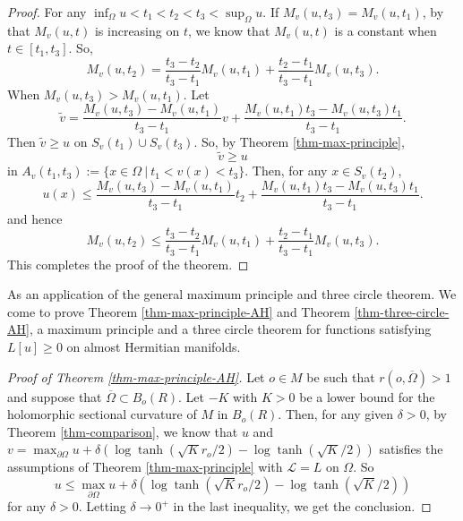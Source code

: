 \documentclass[12pt]{amsart}
\def\ol{\overline}
\def\p{\partial}
\def\ol{\overline}
\theoremstyle{definition}
\theoremstyle{remark}
\numberwithin{equation}{section}
\begin{document}
\begin{proof}
For any $\inf_\Omega u<t_1<t_2<t_3<\sup_\Omega u$.
If $M_v(u,t_3)=M_v(u,t_1)$, by that $M_v(u,t)$ is increasing on $t$, we know that $M_v(u,t)$ is a constant when $t\in [t_1,t_3]$. So,
\begin{equation}
M_v(u,t_2)=\frac{t_3-t_2}{t_3-t_1}M_v(u,t_1)+\frac{t_2-t_1}{t_3-t_1}M_v(u,t_3).
\end{equation}
When $M_v(u,t_3)>M_v(u,t_1)$. Let
\begin{equation}
\tilde v=\frac{M_v(u,t_3)-M_v(u,t_1)}{t_3-t_1}v+\frac{M_v(u,t_1)t_3-M_v(u,t_3)t_1}{t_3-t_1}.
\end{equation}
Then  $\tilde v\geq u$ on $S_v(t_1)\cup S_v(t_3)$. So, by Theorem \ref{thm-max-principle},
\begin{equation}
\tilde v\geq u
\end{equation}
in $A_v(t_1,t_3):=\{x\in\Omega\ |\ t_1<v(x)<t_3\}$. Then, for any $x\in S_v(t_2)$,
\begin{equation}
u(x)\leq \frac{M_v(u,t_3)-M_v(u,t_1)}{t_3-t_1}t_2+\frac{M_v(u,t_1)t_3-M_v(u,t_3)t_1}{t_3-t_1}.
\end{equation}
and hence
\begin{equation}
M_v(u,t_2)\leq \frac{t_3-t_2}{t_3-t_1}M_v(u,t_1)+\frac{t_2-t_1}{t_3-t_1}M_v(u,t_3).
\end{equation}
This completes the proof of the theorem.
\end{proof}
As an application of the general maximum principle  and three circle theorem. We come to prove Theorem \ref{thm-max-principle-AH} and Theorem \ref{thm-three-circle-AH}, a maximum principle and a three circle theorem for functions satisfying $L[u]\geq 0$ on almost Hermitian manifolds.

\begin{proof}[Proof of Theorem \ref{thm-max-principle-AH}]
Let $o\in M$ be such that $r(o,\ol\Omega)>1$ and suppose that $\ol\Omega\subset B_o(R)$. Let $-K$ with $K>0$ be a lower bound for the holomorphic sectional curvature of $M$ in $B_o(R)$. Then, for any given $\delta>0$, by Theorem \ref{thm-comparison}, we know that $u$ and $v=\max_{\p\Omega}u+\delta(\log\tanh( \sqrt Kr_o/2)-\log\tanh(\sqrt K/2))$ satisfies the assumptions of Theorem \ref{thm-max-principle} with $\mathscr L=L$ on $\Omega$. So
\begin{equation}
u\leq \max_{\p\Omega}u+\delta\left(\log\tanh( \sqrt Kr_o/2)-\log\tanh(\sqrt K/2)\right)
\end{equation}
for any $\delta>0$. Letting $\delta\to 0^+$ in the last inequality, we get the conclusion.
\end{proof}
\end{document}
